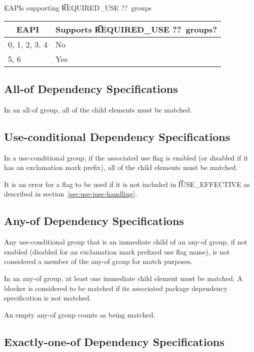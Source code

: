 \begin{centertable}{EAPIs supporting \t{REQUIRED\_USE ??}\ groups}
    \label{tab:at-most-one-of-table}
    \begin{tabular}{ll}
      \toprule
      \multicolumn{1}{c}{\textbf{EAPI}} &
      \multicolumn{1}{c}{\textbf{Supports \t{REQUIRED\_USE ??}\ groups?}} \\
      \midrule
      0, 1, 2, 3, 4     & No  \\
      5, 6              & Yes \\
      \bottomrule
    \end{tabular}
\end{centertable}

\subsection{All-of Dependency Specifications}

In an all-of group, all of the child elements must be matched.

\subsection{Use-conditional Dependency Specifications}

In a use-conditional group, if the associated use flag is enabled (or disabled if it has an
exclamation mark prefix), all of the child elements must be matched.

It is an error for a flag to be used if it is not included in \t{IUSE\_EFFECTIVE} as described in
section~\ref{sec:use-iuse-handling}.

\subsection{Any-of Dependency Specifications}

Any use-conditional group that is an immediate child of an any-of group, if not enabled (disabled
for an exclamation mark prefixed use flag name), is not considered a member of the any-of group
for match purposes.

In an any-of group, at least one immediate child element must be matched. A blocker is
considered to be matched if its associated package dependency specification is not matched.

An empty any-of group counts as being matched.

\subsection{Exactly-one-of Dependency Specifications}

